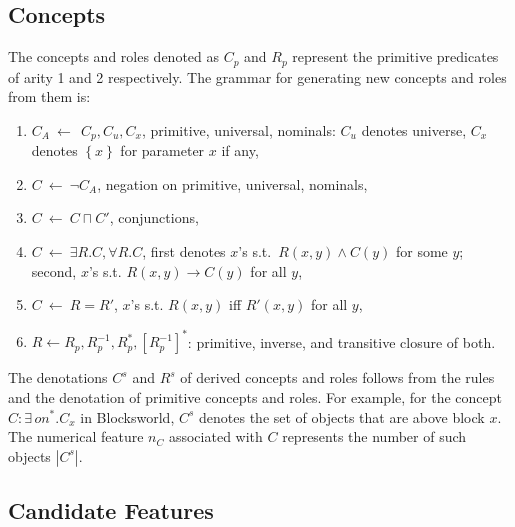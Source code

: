 \documentclass[letterpaper]{article} %
\newcommand{\set}[1]{\ensuremath{\left\{#1 \right\}}}
\begin{document}
\subsection{Concepts}

The concepts and roles denoted as $C_p$ and $R_p$ represent the primitive predicates of arity 1 and 2 respectively.
The grammar for generating new concepts and roles from them is:

\begin{enumerate}[{\small$\bullet$}]
  \item $C_A \ \leftarrow\ \ C_p, C_u, C_x$,  primitive, universal, nominals: $C_u$ denotes  universe,
   $C_x$ denotes $\set{x}$ for parameter $x$ if any,
  \item $C \ \leftarrow\  \neg C_A$,   negation on primitive, universal, nominals,
  \item $C \ \leftarrow\   C \sqcap C'$,   conjunctions,
  \item $C \ \leftarrow\  \exists R.C, \forall R.C$, first denotes $x$'s  s.t.\  $R(x,y) \land C(y)$ for some  $y$;
  second,  $x$'s  s.t. $R(x,y) \rightarrow C(y)$ for all $y$,
  \item $C \ \leftarrow\  R=R'$,  $x$'s  s.t. $R(x,y)$ iff $R'(x,y)$ for all $y$,
  \item $R \leftarrow R_p, R_p^{-1}, R_p^*, [R_p^{-1}]^*$: primitive, inverse, and transitive closure of both.
 \end{enumerate}

The denotations   $C^s$  and $R^s$ of derived concepts and roles follows from the rules and the denotation of primitive
concepts and roles. For example, for the concept  $C: \exists\, on^* . C_x$ in    Blocksworld, 
$C^s$  denotes  the set of objects  that are above block $x$. The numerical feature
$n_C$ associated with $C$  represents the number of such objects $|C^s|$.

\subsection{Candidate Features}
\end{document}
